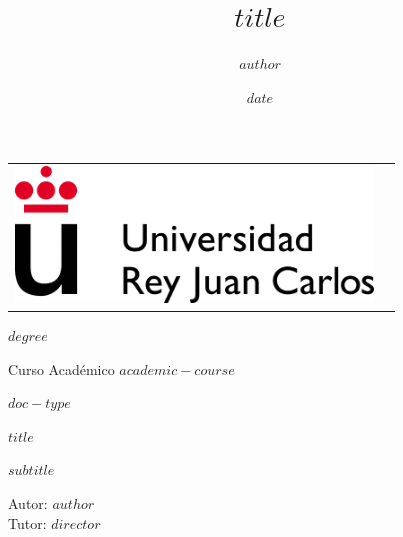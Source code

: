 \documentclass[$if(fontsize)$$fontsize$$else$11pt$endif$,$if(lang)$$babel-lang$,$endif$a4paper,$for(classoption)$$classoption$$sep$,$endfor$]{$documentclass$}
\author{$author$}
\title{$title$}
\date{$date$}
\begin{document}



% 

\begin{titlepage}
\begin{center}
\begin{tabular}[c]{c c}
\includegraphics[width=9.5cm]{img/logoURJC.png}
\\
\end{tabular}

\vspace{3cm}

\Large 
$degree$

\vspace{0.4cm}

\large
Curso Académico $academic-course$

\vspace{0.8cm}

$doc-type$

\vspace{2cm}

\LARGE \MakeUppercase{$title$}\par
\Large $subtitle$
\vspace{3cm}

\large
Autor: \space $author$ \\
Tutor: \space $director$
\end{center}
\end{titlepage}
\end{document}
